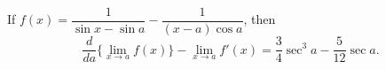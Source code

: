 If
$f(x) = \dfrac{1}{\sin x - \sin a} - \dfrac{1}{(x - a)\cos a}$,
then
\[
\frac{d}{da}\{\lim_{x \to a} f(x)\} - \lim_{x \to a}f'(x)
  = \dfrac{3}{4} \sec^{3} a - \dfrac{5}{12} \sec a.
\]

